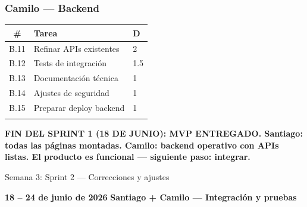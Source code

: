\documentclass[11pt]{article}
\begin{document}
\begin{minipage}[t]{0.48\textwidth}
  \vspace{0pt}
  \subsubsection*{Camilo --- Backend}
  \begin{table}[h]
    \centering
    \footnotesize
    \renewcommand{\arraystretch}{1.15}
    \begin{tabular}{c L{2.5cm} C{0.5cm}}
      \toprule
      {\color{op-white}\bfseries \#} & {\color{op-white}\bfseries Tarea} & {\color{op-white}\bfseries D} \\
      \midrule
      B.11 & Refinar APIs existentes & 2 \\
      B.12 & Tests de integración & 1.5 \\
      B.13 & Documentación técnica & 1 \\
      B.14 & Ajustes de seguridad & 1 \\
      B.15 & Preparar deploy backend & 1 \\
       \\
      \bottomrule
    \end{tabular}
  \end{table}
\end{minipage}

\vspace{0.3cm}

\begin{tcolorbox}[op-mvp]
  \centering\small\bfseries\color{op-verde}
  \MakeUppercase{Fin del Sprint 1 (18 de junio): MVP entregado.} Santiago: todas las páginas montadas. Camilo: backend operativo con APIs listas. El producto es funcional --- siguiente paso: integrar.
\end{tcolorbox}

\newpage

\begin{tcolorbox}[op-fase]
  \makebox[0pt][l]{\hspace*{-5mm}{\color{op-lavanda}\rule{2mm}{1.2em}}}%
  \hspace{3mm} Semana 3: Sprint 2 --- Correcciones y ajustes
\end{tcolorbox}

\medskip
{\small\color{op-textsec} \textbf{18 -- 24 de junio de 2026} \hfill \textbf{Santiago + Camilo --- Integración y pruebas}}
\end{document}
